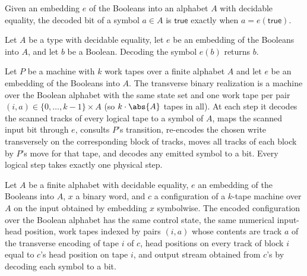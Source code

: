 \begin{definition}
\label{Complexity.parallelBit}
\leanok
Given an embedding $e$ of the Booleans into an alphabet $A$ with decidable equality,
the decoded bit of a symbol $a \in A$ is $\mathsf{true}$ exactly when
$a = e(\mathsf{true})$.
\end{definition}

\begin{lemma}
\label{Complexity.parallelBit_embed}
\leanok
{}
Let $A$ be a type with decidable equality, let $e$ be an embedding of the Booleans into
$A$, and let $b$ be a Boolean. Decoding the symbol $e(b)$ returns $b$.
\end{lemma}

\begin{definition}
\label{Complexity.parallelTM}
\leanok
{}
Let $P$ be a machine with $k$ work tapes over a finite alphabet $A$ and let $e$ be an
embedding of the Booleans into $A$. The transverse binary realization is a machine
over the Boolean alphabet with the same state set and one work tape per pair
$(i, a) \in \{0, \dots, k-1\} \times A$ (so $k \cdot \abs{A}$ tapes in all). At each
step it decodes the scanned tracks of every logical tape to a symbol of $A$, maps the
scanned input bit through $e$, consults $P$'s transition, re-encodes the chosen write
transversely on the corresponding block of tracks, moves all tracks of each block by
$P$'s move for that tape, and decodes any emitted symbol to a bit. Every logical step
takes exactly one physical step.
\end{definition}

\begin{definition}
\label{Complexity.parallelCfg}
\leanok
{}
Let $A$ be a finite alphabet with decidable equality, $e$ an embedding of the
Booleans into $A$, $x$ a binary word, and $c$ a configuration of a $k$-tape machine
over $A$ on the input obtained by embedding $x$ symbolwise. The encoded configuration
over the Boolean alphabet has the same control state, the same numerical input-head
position, work tapes indexed by pairs $(i, a)$ whose contents are track $a$ of the
transverse encoding of tape $i$ of $c$, head positions on every track of block $i$
equal to $c$'s head position on tape $i$, and output stream obtained from $c$'s by
decoding each symbol to a bit.
\end{definition}

